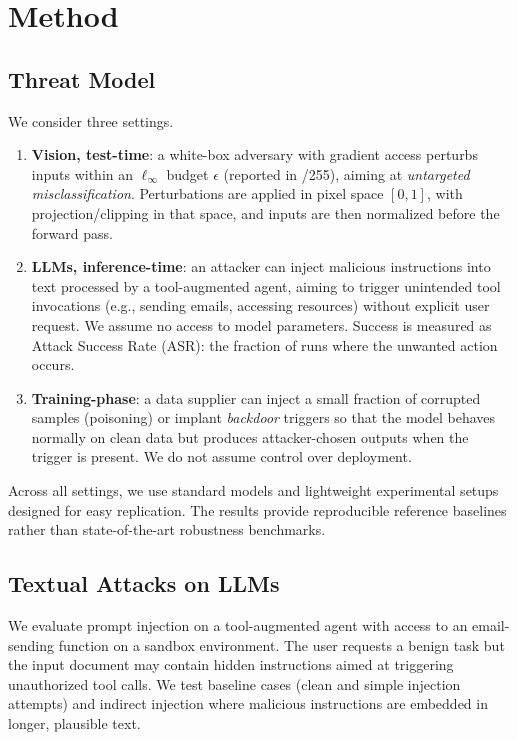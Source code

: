 \documentclass{article}
\begin{document}
\section{Method}\label{sec:method}
\subsection{Threat Model}
We consider three settings.
\begin{enumerate}[noitemsep, topsep=2pt, parsep=0pt, partopsep=0pt, leftmargin=*]
  \item \textbf{Vision, test-time}: a white-box adversary with gradient access perturbs inputs within an $\ell_\infty$ budget $\epsilon$ (reported in /255), aiming at \emph{untargeted misclassification}. Perturbations are applied in pixel space $[0,1]$, with projection/clipping in that space, and inputs are then normalized before the forward pass.
  \item \textbf{LLMs, inference-time}: an attacker can inject malicious instructions into text processed by a tool-augmented agent, aiming to trigger unintended tool invocations (e.g., sending emails, accessing resources) without explicit user request. We assume no access to model parameters. Success is measured as Attack Success Rate (ASR): the fraction of runs where the unwanted action occurs.
  \item \textbf{Training-phase}: a data supplier can inject a small fraction of corrupted samples (poisoning) or implant \emph{backdoor} triggers so that the model behaves normally on clean data but produces attacker-chosen outputs when the trigger is present. We do not assume control over deployment.
\end{enumerate}

Across all settings, we use standard models and lightweight experimental setups designed for easy replication. The results provide reproducible reference baselines rather than state-of-the-art robustness benchmarks.


\subsection{Textual Attacks on LLMs}
We evaluate prompt injection on a tool-augmented agent with access to an email-sending function on a sandbox environment. The user requests a benign task but the input document may contain hidden instructions aimed at triggering unauthorized tool calls. We test baseline cases (clean and simple injection attempts) and indirect injection where malicious instructions are embedded in longer, plausible text.
\end{document}
